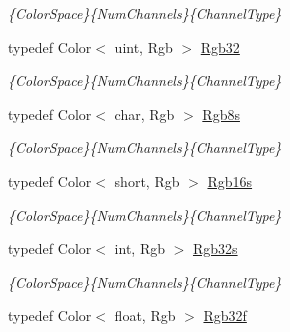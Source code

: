 \begin{DoxyCompactItemize}
\begin{DoxyCompactList}\small\item\em \{Color\-Space\}\{Num\-Channels\}\{Channel\-Type\} \end{DoxyCompactList}\item 
\hypertarget{group___color_types_ga16d76bf5828f2254cd0812609f947dae}{typedef Color$<$ uint, Rgb $>$ \hyperlink{group___color_types_ga16d76bf5828f2254cd0812609f947dae}{Rgb32}}\label{group___color_types_ga16d76bf5828f2254cd0812609f947dae}

\begin{DoxyCompactList}\small\item\em \{Color\-Space\}\{Num\-Channels\}\{Channel\-Type\} \end{DoxyCompactList}\item 
\hypertarget{group___color_types_gaa096e4d2bffaedbe7f3614578af91109}{typedef Color$<$ char, Rgb $>$ \hyperlink{group___color_types_gaa096e4d2bffaedbe7f3614578af91109}{Rgb8s}}\label{group___color_types_gaa096e4d2bffaedbe7f3614578af91109}

\begin{DoxyCompactList}\small\item\em \{Color\-Space\}\{Num\-Channels\}\{Channel\-Type\} \end{DoxyCompactList}\item 
\hypertarget{group___color_types_gabedfd8c005bd02228e5639062ac29525}{typedef Color$<$ short, Rgb $>$ \hyperlink{group___color_types_gabedfd8c005bd02228e5639062ac29525}{Rgb16s}}\label{group___color_types_gabedfd8c005bd02228e5639062ac29525}

\begin{DoxyCompactList}\small\item\em \{Color\-Space\}\{Num\-Channels\}\{Channel\-Type\} \end{DoxyCompactList}\item 
\hypertarget{group___color_types_gad629b7ab363ae148b3373d71fd0cfc56}{typedef Color$<$ int, Rgb $>$ \hyperlink{group___color_types_gad629b7ab363ae148b3373d71fd0cfc56}{Rgb32s}}\label{group___color_types_gad629b7ab363ae148b3373d71fd0cfc56}

\begin{DoxyCompactList}\small\item\em \{Color\-Space\}\{Num\-Channels\}\{Channel\-Type\} \end{DoxyCompactList}\item 
\hypertarget{group___color_types_ga869d34729aa0a8429728a14a510d1c66}{typedef Color$<$ float, Rgb $>$ \hyperlink{group___color_types_ga869d34729aa0a8429728a14a510d1c66}{Rgb32f}}\label{group___color_types_ga869d34729aa0a8429728a14a510d1c66}


\end{DoxyCompactItemize}

